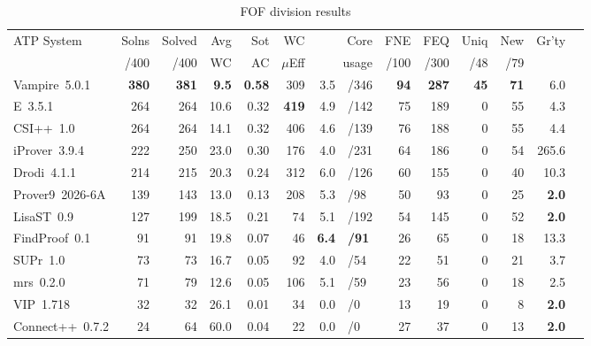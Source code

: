 \documentclass[aic]{iosart2x}
\newcommand{\bb}[1]{\bf {#1}}
\begin{document}
\begin{table}[tbh]
\caption{FOF division results}
\label{FOFSummary}
\begin{tabular}{lrrrrrr@{}l@{}rrrrrr}
\hline
ATP System             & Solns & Solved & Avg  & Sot & WC       & \multicolumn{2}{r}{Core} & FNE & FEQ  &Uniq & New & Gr'ty \\
                       & /400  & /400   & WC   & AC  & $\mu$Eff & \multicolumn{2}{r}{usage}&/100 &/300  & /48 & /79 &       \\
\hline
Vampire~5.0.1          &  \bb{380}  &  \bb{381}   &  \bb{9.5} & \bb{0.58} & 309     & 3.5       & {\tiny /346} &   \bb{94} & \bb{287} &  \bb{45} &  \bb{71} &  6.0  \\
E~3.5.1                &  264  &  264   & 10.6 & 0.32 & \bb{419}     & 4.9       & {\tiny /142} &   75 & 189 &   0 &  55 &  4.3  \\
CSI++~1.0              &  264  &  264   & 14.1 & 0.32 & 406     & 4.6       & {\tiny /139} &   76 & 188 &   0 &  55 &  4.4  \\
iProver~3.9.4          &  222  &  250   & 23.0 & 0.30 & 176     & 4.0       & {\tiny /231} &   64 & 186 &   0 &  54 &265.6  \\
Drodi~4.1.1            &  214  &  215   & 20.3 & 0.24 & 312     & 6.0       & {\tiny /126} &   60 & 155 &   0 &  40 & 10.3  \\
Prover9~2026-6A        &  139  &  143   & 13.0 & 0.13 & 208     & 5.3       & {\tiny /98 } &   50 &  93 &   0 &  25 &  \bb{2.0}  \\
LisaST~0.9             &  127  &  199   & 18.5 & 0.21 &  74     & 5.1       & {\tiny /192} &   54 & 145 &   0 &  52 &  \bb{2.0}  \\
FindProof~0.1          &   91  &   91   & 19.8 & 0.07 &  46     & \bb{6.4}       & {\tiny \bb{/91} } &   26 &  65 &   0 &  18 & 13.3  \\
SUPr~1.0               &   73  &   73   & 16.7 & 0.05 &  92     & 4.0       & {\tiny /54 } &   22 &  51 &   0 &  21 &  3.7  \\
mrs~0.2.0              &   71  &   79   & 12.6 & 0.05 & 106     & 5.1       & {\tiny /59 } &   23 &  56 &   0 &  18 &  2.5  \\
VIP~1.718              &   32  &   32   & 26.1 & 0.01 &  34     & 0.0       & {\tiny /0  } &   13 &  19 &   0 &   8 &  \bb{2.0}  \\
Connect++~0.7.2        &   24  &   64   & 60.0 & 0.04 &  22     & 0.0       & {\tiny /0  } &   27 &  37 &   0 &  13 &  \bb{2.0}  \\

\end{tabular}
\end{table}
\end{document}
